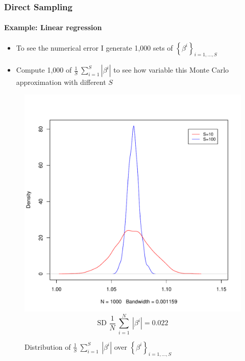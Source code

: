 \documentclass[
  shownotes,
  xcolor={svgnames},
  hyperref={colorlinks,citecolor=DarkBlue,linkcolor=DarkRed,urlcolor=DarkBlue}
  , aspectratio=169]{beamer}
\begin{document}
\begin{frame}[fragile]
\frametitle{Direct Sampling}
\framesubtitle{Example: Linear regression}

\begin{itemize}
\item To see the numerical error I generate 1,000 sets of $\left\{ \beta^{i} \right\}_{i = 1,\ldots,S}$

\item Compute 1,000 of $\frac{1}{S}\ \sum_{i = 1}^{S}\left| \beta^{i} \right|$ to see how variable this Monte Carlo approximation with different $S$

\end{itemize}




  \begin{figure}[H] \centering
  \centering
  \caption{Distribution of $\frac{1}{S}\ \sum_{i = 1}^{S}{\ \left| \beta^{i} \right|}$ over $\left\{ \beta^{i} \right\}_{i = 1,\ldots,S}$}
  \includegraphics[scale=0.2]{figures/n100}
  \\
  \tiny 
  $$\text{SD\ }\frac{1}{N}\ \sum_{i = 1}^{N}{\ \left| \beta^{i} \right|} = 0.022$$
\end{figure}  




\end{frame}
\end{document}
